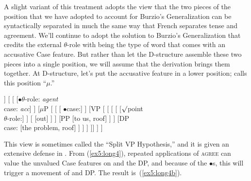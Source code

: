 A slight variant of this treatment adopts the view that the two pieces of the  position that we have adopted to account for Burzio's Generalization can be syntactically separated in much the same way that French separates tense and agreement. We'll continue to adopt the solution to Burzio's Generalization that credits the external $\theta$-role with being the type of word that comes with an accusative Case feature. But rather than let the D-structure assemble these two pieces into a single  position, we will assume that the derivation brings them together. At D-structure, let's put the accusative feature in a lower  position; \citet{Johnson:1991} calls this position ``$\mu$.''%
%
%
%
\begin{exe}
	\raggedright
	\ex \label{ex5:long4} 
	\small
	\begin{forest}
	[vP
		[DP [she, roof]]
		[ 
			[ [$\bullet$$\theta$-role: \emph{agent}\\ case: \emph{acc}] ]
			[$\mu$P [\ibar{$\mu$}
				[\obar{$\mu$} [ $\bullet$case:] ]
				[VP [
					[
						[
							[ [$\surd$point\\ $\theta$-role:] ]
							[ [out] ]
						 ]
						[PP [to us, roof] ]
					 ]
					[DP\\ case: [the problem, roof] ]
				] ]
			]]
		]
	]
	\end{forest}
\end{exe}
This view is sometimes called the ``Split VP Hypothesis,'' and it is given an extensive defense in \citet{Koizumi:1995}. From (\ref{ex5:long4}), repeated applications of \textsc{agree} can value the unvalued Case features on \obar{$\mu$} and the DP, and because of the $\bullet$s, this will trigger a movement of \obar{$\mu$} and DP. The result is~(\ref{ex5:long4b}).
